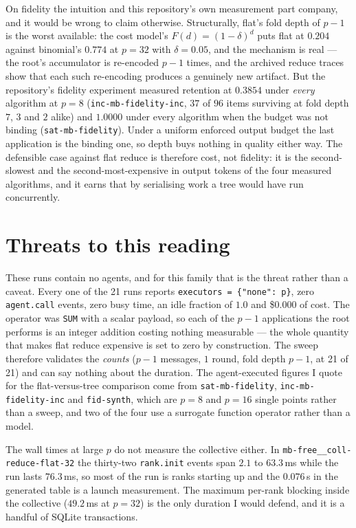 \documentclass[11pt]{article}
\begin{document}
On fidelity the intuition and this repository's own measurement part company, and it would be
wrong to claim otherwise. Structurally, flat's fold depth of $p-1$ is the worst available: the
cost model's $F(d) = (1-\delta)^d$ puts flat at $0.204$ against binomial's $0.774$ at $p=32$
with $\delta = 0.05$, and the mechanism is real --- the root's accumulator is re-encoded $p-1$
times, and the archived reduce traces show that each such re-encoding produces a genuinely new
artifact. But the repository's fidelity experiment measured retention at $0.3854$ under
\emph{every} algorithm at $p=8$ (\texttt{inc-mb-fidelity-inc}, $37$ of $96$ items surviving at
fold depth $7$, $3$ and $2$ alike) and $1.0000$ under every algorithm when the budget was not
binding (\texttt{sat-mb-fidelity}). Under a uniform enforced output budget
the last application is the binding one, so depth buys nothing in quality either way. The
defensible case against flat reduce is therefore cost, not fidelity: it is the second-slowest
and the second-most-expensive in output tokens of the four measured algorithms, and it earns
that by serialising work a tree would have run concurrently.

\section{Threats to this reading}

These runs contain no agents, and for this family that is the threat rather than a caveat.
Every one of the 21 runs reports \texttt{executors = \{"none": p\}}, zero \texttt{agent.call}
events, zero busy time, an idle fraction of $1.0$ and \$0.000 of cost. The operator was
\texttt{SUM} with a scalar payload, so each of the $p-1$ applications the root performs is an
integer addition costing nothing measurable --- the whole quantity that makes flat reduce
expensive is set to zero by construction. The sweep therefore validates the \emph{counts}
($p-1$ messages, $1$ round, fold depth $p-1$, at 21 of 21) and can say nothing about the
duration. The agent-executed figures I quote for the flat-versus-tree comparison come from
\texttt{sat-mb-fidelity}, \texttt{inc-mb-fidelity-inc} and \texttt{fid-synth}, which are $p=8$
and $p=16$ single points rather than a sweep, and two of the four use a surrogate function
operator rather than a model.

The wall times at large $p$ do not measure the collective either. In
\texttt{mb-free\_\_coll-reduce-flat-32} the thirty-two \texttt{rank.init} events span $2.1$ to
$63.3$\,ms while the run lasts $76.3$\,ms, so most of the run is ranks starting up and the
$0.076$\,s in the generated table is a launch measurement. The maximum per-rank blocking inside
the collective ($49.2$\,ms at $p=32$) is the only duration I would defend, and it is a handful
of SQLite transactions.
\end{document}
